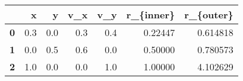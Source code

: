 \begin{tabular}{lrrrrrr}
\toprule
{} &    x &    y &  v\_x &  v\_y &  r\_\{inner\} &  r\_\{outer\} \\
\midrule
\textbf{0} &  0.3 &  0.0 &  0.3 &  0.4 &    0.22447 &   0.614818 \\
\textbf{1} &  0.0 &  0.5 &  0.6 &  0.0 &    0.50000 &   0.780573 \\
\textbf{2} &  1.0 &  0.0 &  0.0 &  1.0 &    1.00000 &   4.102629 \\
\bottomrule
\end{tabular}

